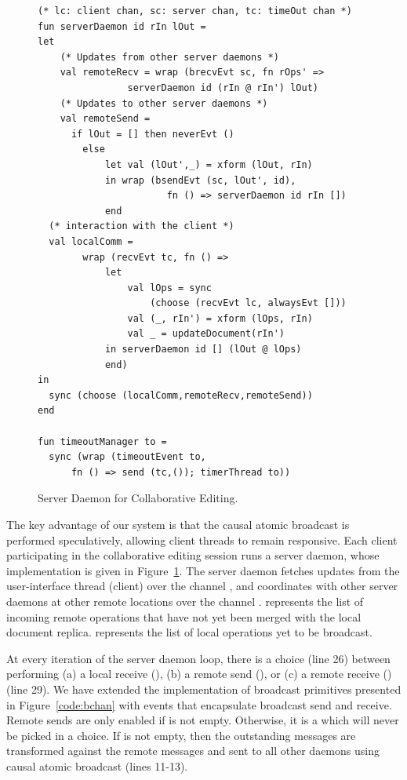 \begin{figure}
\begin{lstlisting}
(* lc: client chan, sc: server chan, tc: timeOut chan *)
fun serverDaemon id rIn lOut =
let
	(* Updates from other server daemons *)
	val remoteRecv = wrap (brecvEvt sc, fn rOps' =>
				serverDaemon id (rIn @ rIn') lOut)
	(* Updates to other server daemons *)
	val remoteSend =
	  if lOut = [] then neverEvt ()
		else
			let val (lOut',_) = xform (lOut, rIn)
			in wrap (bsendEvt (sc, lOut', id),
  					   fn () => serverDaemon id rIn [])
			end
  (* interaction with the client *)
  val localComm =
		wrap (recvEvt tc, fn () =>
			let
				val lOps = sync
				  	(choose (recvEvt lc, alwaysEvt []))
				val (_, rIn') = xform (lOps, rIn)
				val _ = updateDocument(rIn')
			in serverDaemon id [] (lOut @ lOps)
			end)
in
  sync (choose (localComm,remoteRecv,remoteSend))
end

fun timeoutManager to =
  sync (wrap (timeoutEvent to,
	  fn () => send (tc,()); timerThread to))
\end{lstlisting}
\caption{Server Daemon for Collaborative Editing.}
\label{code:serverDaemon}
\end{figure}

The key advantage of our system is that the causal atomic broadcast is
performed speculatively, allowing client threads to remain responsive. Each
client participating in the collaborative editing session runs a server daemon,
whose implementation is given in Figure~\ref{code:serverDaemon}. The server
daemon fetches updates from the user-interface thread (client) over the channel
, and coordinates with other server daemons at other remote locations
over the channel .   represents the list of incoming remote
operations that have not yet been merged with the local document replica.
 represents the list of local operations yet to be broadcast.

At every iteration of the server daemon loop, there is a choice (line 26) between
performing (a) a local receive (), (b) a remote send
(), or (c) a remote receive () (line 29). We
have extended the implementation of broadcast primitives presented in
Figure~\ref{code:bchan} with events that encapsulate broadcast send and
receive. Remote sends are only enabled if  is not empty. Otherwise,
it is a  which will never be picked in a choice. If
 is not empty, then the outstanding messages are transformed
against the remote messages and sent to all other daemons using causal atomic
broadcast (lines 11-13).

